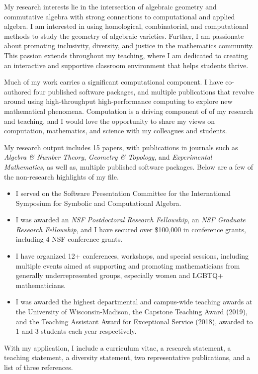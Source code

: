 \documentclass[11pt]{article}
\begin{document}
My research interests lie in the intersection of algebraic geometry and commutative algebra with strong connections to computational and applied algebra. I am interested in using homological, combinatorial, and computational methods to study the geometry of algebraic varieties. Further, I am passionate about promoting inclusivity, diversity, and justice in the mathematics community. This passion extends throughout my teaching, where I am dedicated to creating an interactive and supportive classroom environment that helps students thrive.

Much of my work carries a significant computational component. I have co-authored four published software packages, and multiple publications that revolve around using high-throughput high-performance computing to explore new mathematical phenomena. Computation is a driving component of of my research and teaching, and I would love the opportunity to share my views on computation, mathematics, and science with my colleagues and students. 

My research output includes 15 papers, with publications in journals such as \textit{Algebra \& Number Theory}, \textit{Geometry \& Topology}, and \textit{Experimental Mathematics}, as well as, multiple published software packages. Below are a few of the non-research highlights of my file.

\begin{itemize}[leftmargin=*]
\item I served on the Software Presentation Committee for the International Symposium for Symbolic and Computational Algebra.
\item I was awarded an \textit{NSF Postdoctoral Research Fellowship}, an \textit{NSF Graduate Research Fellowship}, and I have secured over \$100,000 in conference grants, including 4 NSF conference grants. 
\item I have organized 12+ conferences, workshops, and special sessions, including multiple events aimed at supporting and promoting mathematicians from generally underrepresented groups, especially women and LGBTQ+ mathematicians. 
\item I was awarded the highest departmental and campus-wide teaching awards at the University of Wisconsin-Madison, the Capstone Teaching Award (2019), and the Teaching Assistant Award for Exceptional Service (2018), awarded to 1 and 3 students each year respectively. 
\end{itemize}

With my application, I include a curriculum vitae, a research statement, a teaching statement, a diversity statement, two representative publications, and a list of three references. 
\end{document}
